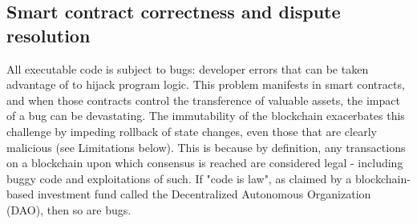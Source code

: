 
\subsection{Smart contract correctness and dispute resolution}
All executable code is subject to bugs: developer errors that can be taken advantage of to hijack program logic. This problem manifests in smart contracts, and when those contracts control the transference of valuable assets, the impact of a bug can be devastating. The immutability of the blockchain exacerbates this challenge by impeding rollback of state changes, even those that are clearly malicious (see Limitations below). This is because by definition, any transactions on a blockchain upon which consensus is reached are considered legal - including buggy code and exploitations of such. If "code is law", as claimed by a blockchain-based investment fund called the Decentralized Autonomous Organization (DAO), then so are bugs. 

